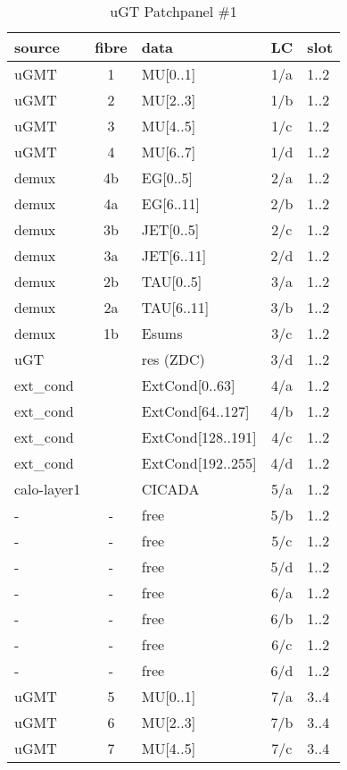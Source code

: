 \begin{longtable}{|l|c|l|c|l|}
\caption{uGT Patchpanel \#1}
    \label{tab:app:ugt_opt_pp_1}\\
\hline
\textbf{source}& \textbf{fibre}& \textbf{data}& \textbf{LC}& \textbf{slot}\\
\hline
\hline
\endhead
uGMT  & 1   & MU[0..1]   & 1/a  & 1..2 \\\hline
uGMT  & 2   & MU[2..3]   & 1/b  & 1..2 \\\hline
uGMT  & 3   & MU[4..5]   & 1/c  & 1..2 \\\hline
uGMT  & 4   & MU[6..7]   & 1/d  & 1..2 \\\hline
demux & 4b  & EG[0..5]   & 2/a  & 1..2 \\\hline
demux & 4a  & EG[6..11]  & 2/b  & 1..2 \\\hline
demux & 3b  & JET[0..5]  & 2/c  & 1..2 \\\hline
demux & 3a  & JET[6..11] & 2/d  & 1..2 \\\hline
demux & 2b  & TAU[0..5]  & 3/a  & 1..2 \\\hline
demux & 2a  & TAU[6..11] & 3/b  & 1..2 \\\hline
demux & 1b  & Esums      & 3/c  & 1..2 \\\hline
uGT   &     & res (ZDC)  & 3/d  & 1..2 \\\hline
ext\_cond &     & ExtCond[0..63]    & 4/a  & 1..2 \\\hline
ext\_cond &     & ExtCond[64..127]  & 4/b  & 1..2 \\\hline
ext\_cond &     & ExtCond[128..191] & 4/c  & 1..2 \\\hline
ext\_cond &     & ExtCond[192..255] & 4/d  & 1..2 \\\hline
calo-layer1 &   & CICADA & 5/a  & 1..2 \\\hline
- & - & free & 5/b  & 1..2 \\\hline
- & - & free & 5/c  & 1..2 \\\hline
- & - & free & 5/d  & 1..2 \\\hline
- & - & free & 6/a  & 1..2 \\\hline
- & - & free & 6/b  & 1..2 \\\hline
- & - & free & 6/c  & 1..2 \\\hline
- & - & free & 6/d  & 1..2 \\\hline
\hline
uGMT  & 5   & MU[0..1]   & 7/a  & 3..4 \\\hline
uGMT  & 6   & MU[2..3]   & 7/b  & 3..4 \\\hline
uGMT  & 7   & MU[4..5]   & 7/c  & 3..4 \\\hline

\end{longtable}
